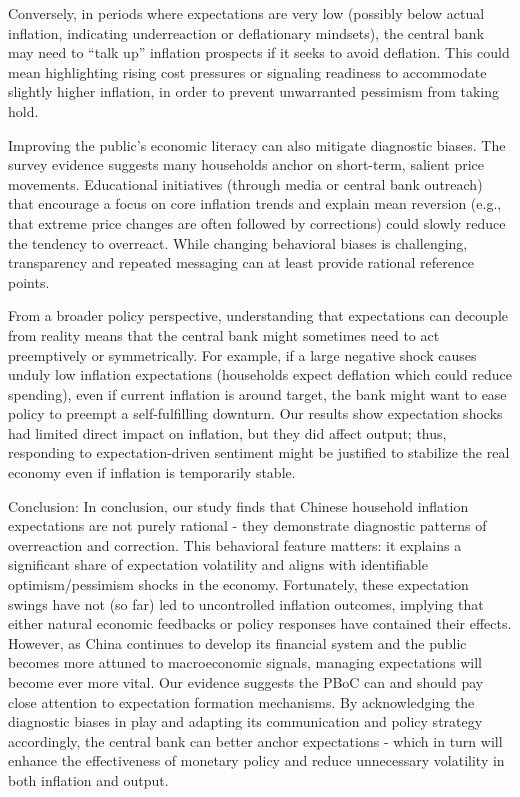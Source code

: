 \documentclass[12pt]{article}
\begin{document}
Conversely, in periods where expectations are very low (possibly below actual inflation, indicating underreaction or deflationary mindsets), the central bank may need to “talk up” inflation prospects if it seeks to avoid deflation. This could mean highlighting rising cost pressures or signaling readiness to accommodate slightly higher inflation, in order to prevent unwarranted pessimism from taking hold.

Improving the public's economic literacy can also mitigate diagnostic biases. The survey evidence suggests many households anchor on short-term, salient price movements. Educational initiatives (through media or central bank outreach) that encourage a focus on core inflation trends and explain mean reversion (e.g., that extreme price changes are often followed by corrections) could slowly reduce the tendency to overreact. While changing behavioral biases is challenging, transparency and repeated messaging can at least provide rational reference points.

From a broader policy perspective, understanding that expectations can decouple from reality means that the central bank might sometimes need to act preemptively or symmetrically. For example, if a large negative shock causes unduly low inflation expectations (households expect deflation which could reduce spending), even if current inflation is around target, the bank might want to ease policy to preempt a self-fulfilling downturn. Our results show expectation shocks had limited direct impact on inflation, but they did affect output; thus, responding to expectation-driven sentiment might be justified to stabilize the real economy even if inflation is temporarily stable.

Conclusion: In conclusion, our study finds that Chinese household inflation expectations are not purely rational - they demonstrate diagnostic patterns of overreaction and correction. This behavioral feature matters: it explains a significant share of expectation volatility and aligns with identifiable optimism/pessimism shocks in the economy. Fortunately, these expectation swings have not (so far) led to uncontrolled inflation outcomes, implying that either natural economic feedbacks or policy responses have contained their effects. However, as China continues to develop its financial system and the public becomes more attuned to macroeconomic signals, managing expectations will become ever more vital. Our evidence suggests the PBoC can and should pay close attention to expectation formation mechanisms. By acknowledging the diagnostic biases in play and adapting its communication and policy strategy accordingly, the central bank can better anchor expectations - which in turn will enhance the effectiveness of monetary policy and reduce unnecessary volatility in both inflation and output.
\end{document}
